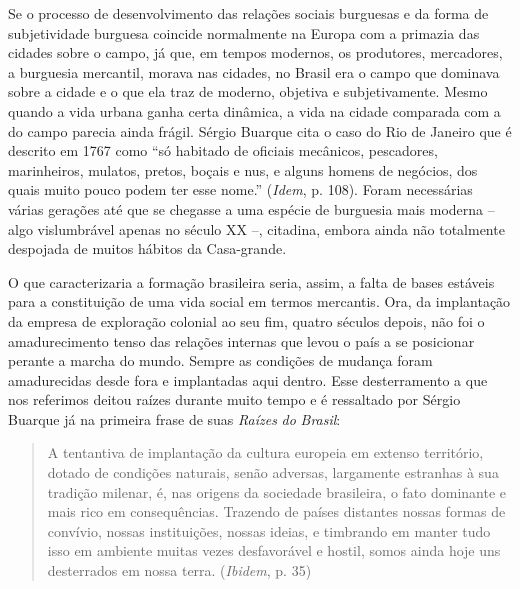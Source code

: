 Se o processo de desenvolvimento das relações sociais burguesas e da
forma de subjetividade burguesa coincide normalmente na Europa com a
primazia das cidades sobre o campo, já que, em tempos modernos, os
produtores, mercadores, a burguesia mercantil, morava nas cidades, no
Brasil era o campo que dominava sobre a cidade e o que ela traz de
moderno, objetiva e subjetivamente. Mesmo quando a vida urbana ganha
certa dinâmica, a vida na cidade comparada com a do campo parecia ainda
frágil. Sérgio Buarque cita o caso do Rio de Janeiro que é descrito em
1767 como ``só habitado de oficiais mecânicos, pescadores, marinheiros,
mulatos, pretos, boçais e nus, e alguns homens de negócios, dos quais
muito pouco podem ter esse nome.'' (\emph{Idem}, p. 108). Foram
necessárias várias gerações até que se chegasse a uma espécie de
burguesia mais moderna -- algo vislumbrável apenas no século XX --,
citadina, embora ainda não totalmente despojada de muitos hábitos da
Casa-grande.

O que caracterizaria a formação brasileira seria, assim, a falta de
bases estáveis para a constituição de uma vida social em termos
mercantis. Ora, da implantação da empresa de exploração colonial ao seu
fim, quatro séculos depois, não foi o amadurecimento tenso das relações
internas que levou o país a se posicionar perante a marcha do mundo.
Sempre as condições de mudança foram amadurecidas desde fora e
implantadas aqui dentro. Esse desterramento a que nos referimos deitou
raízes durante muito tempo e é ressaltado por Sérgio Buarque já na
primeira frase de suas \emph{Raízes} \emph{do} \emph{Brasil}:

\begin{quote}
A tentantiva de implantação da cultura europeia em extenso território,
dotado de condições naturais, senão adversas, largamente estranhas à sua
tradição milenar, é, nas origens da sociedade brasileira, o fato
dominante e mais rico em consequências. Trazendo de países distantes
nossas formas de convívio, nossas instituições, nossas ideias, e
timbrando em manter tudo isso em ambiente muitas vezes desfavorável e
hostil, somos ainda hoje uns desterrados em nossa terra. (\emph{Ibidem},
p. 35)
\end{quote}

